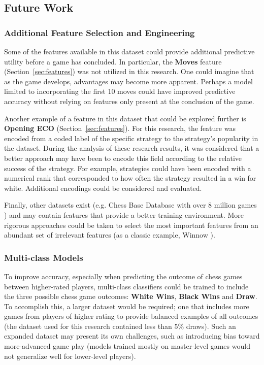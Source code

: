 \documentclass[12pt]{article}
\begin{document}
\subsection{Future Work}

\subsubsection{Additional Feature Selection and Engineering}
\label{sec:feature-eng}
Some of the features available in this dataset could provide additional predictive utility before a game has concluded. In particular, the \textbf{Moves} feature (Section~\ref{sec:features}) was not utilized in this research. One could imagine that as the game develops, advantages may become more apparent. Perhaps a model limited to incorporating the first 10 moves could have improved predictive accuracy without relying on features only present at the conclusion of the game.

Another example of a feature in this dataset that could be explored further is \textbf{Opening ECO} (Section~\ref{sec:features}). For this research, the feature was encoded from a coded label of the specific strategy to the strategy's popularity in the dataset. During the analysis of these research results, it was considered that a better approach may have been to encode this field according to the relative success of the strategy. For example, strategies could have been encoded with a numerical rank that corresponded to how often the strategy resulted in a win for white. Additional encodings could be considered and evaluated.

Finally, other datasets exist (e.g. Chess Base Database with over 8 million games \cite{chessBaseDb}) and may contain features that provide a better training environment. More rigorous approaches could be taken to select the most important features from an abundant set of irrelevant features (as a classic example, Winnow \cite{Littlestone1988}).

\subsubsection{Multi-class Models}
\label{sec:multiclass}
To improve accuracy, especially when predicting the outcome of chess games between higher-rated players, multi-class classifiers could be trained to include the three possible chess game outcomes: \textbf{White Wins}, \textbf{Black Wins} and \textbf{Draw}. To accomplish this, a larger dataset would be required; one that includes more games from players of higher rating to provide balanced examples of all outcomes (the dataset used for this research contained less than $5\%$ draws). Such an expanded dataset may present its own challenges, such as introducing bias toward more-advanced game play (models trained mostly on master-level games would not generalize well for lower-level players).
\end{document}

